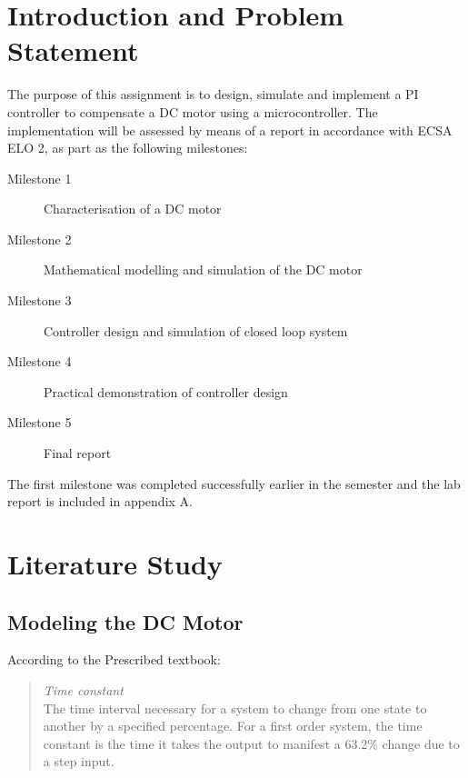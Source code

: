 
\chapter{Introduction and Problem Statement}
The purpose of this assignment is to design, simulate and implement a PI controller to compensate a DC motor using a microcontroller. The implementation will be assessed by means of a report in accordance with ECSA ELO 2, as part as the following milestones:
\begin{description}
	\item[Milestone 1] Characterisation of a DC motor
	\item[Milestone 2] Mathematical modelling and simulation of the DC motor
	\item[Milestone 3]Controller design and simulation of closed loop system
	\item[Milestone 4] Practical demonstration of controller design
	\item[Milestone 5]  Final report
\end{description}
The first milestone was completed successfully earlier in the semester and the lab report is included in appendix A. 







\chapter{Literature Study}
\section{Modeling the DC Motor}
According to the Prescribed textbook\cite[p.160]{dorf2011modern}: \\ \blockquote{\emph{Time constant}\\ The time interval necessary for a system to
change from one state to another by a specified percentage. For a first order system, the time constant is
the time it takes the output to manifest a 63.2\%
change due to a step input.}


